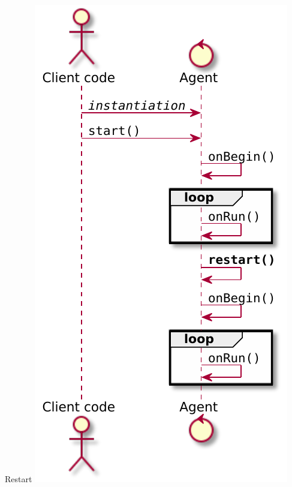 \documentclass[presentation]{beamer}\mode<presentation>{\usetheme{AMSCesenaPurpleAndGold}}
\begin{document}
\begin{frame}{Restart}\centering
	\includegraphics[height=.8\textheight]{img/restarted-flow.pdf}
\end{frame}
\end{document}
